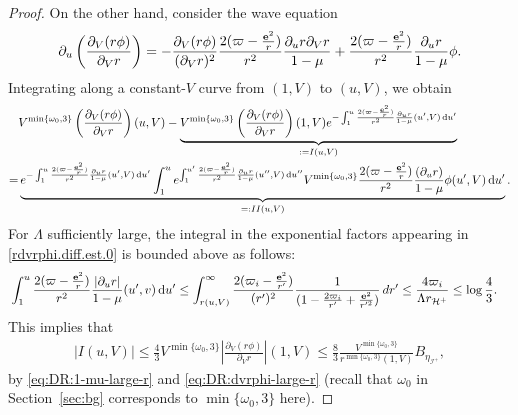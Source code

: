 \documentclass[10pt, reqno]{amsart}
\theoremstyle{definition}
\theoremstyle{remark}
\theoremstyle{conjecture}
\numberwithin{equation}{section}
\newcommand{\set}[1]{\{#1\}}
\newcommand{\ud}{\mathrm{d}}
\newcommand{\rd}{\partial}
\newcommand{\0}{\emptyset}
\newcommand{\omg}{\omega}
\newcommand{\bfe}{{\bf e}}
\newcommand{\calH}{\mathcal H}
\newcommand{\calI}{\mathcal I}
\newcommand{\f}{\frac}
\newcommand{\EH}{\calH^{+}}
\newcommand{\e}{\bfe}							%
\newcommand{\NI}{\calI^{+}}						%
\begin{document}
\begin{proof}
On the other hand, consider the wave equation
$$\rd_u\left(\f{\rd_V(r\phi)}{\rd_V r}\right) = -\f{\rd_V(r\phi)}{(\rd_V r)^2} \frac{2(\varpi - \frac{\e^{2}}{r})}{r^{2}} \frac{\rd_{u} r \rd_{V} r}{1-\mu} + \frac{2(\varpi - \frac{\e^{2}}{r})}{r^{2}} \frac{\rd_{u} r}{1-\mu}\phi.$$
Integrating along a constant-$V$ curve from $(1,V)$ to $(u,V)$, we obtain
\begin{equation}\label{rdvrphi.diff.est.0}
\begin{split}
&V^{\min\{\omg_0,3\}}\left(\f{\rd_V(r\phi)}{\rd_V r}\right)(u,V)
-\underbrace{V^{\min\{\omg_0, 3\}}\left(\f{\rd_V(r\phi)}{\rd_V r}\right)(1,V) e^{-\int_{1}^u \frac{2(\varpi - \frac{\e^{2}}{r})}{r^{2}} \frac{\rd_{u} r }{1-\mu}(u',V) \, \ud u'}}_{:=I(u,V)}\\
= & \underbrace{e^{-\int_{1}^u \frac{2(\varpi - \frac{\e^{2}}{r})}{r^{2}} \frac{\rd_{u} r }{1-\mu}(u',V) \, \ud u'}\int_{1}^u e^{\int_{1}^{u'} \frac{2(\varpi - \frac{\e^{2}}{r})}{r^{2}} \frac{\rd_{u} r }{1-\mu}(u'',V) \, \ud u''} V^{\min\{\omg_0,3\}}\frac{2(\varpi - \frac{\e^{2}}{r})}{r^{2}} \frac{(\rd_{u} r)}{1-\mu}\phi(u',V) \, \ud u'}_{=:II(u,V)}.
\end{split}
\end{equation}
For $\Lambda$ sufficiently large, the integral in the exponential factors appearing in \eqref{rdvrphi.diff.est.0} is bounded above as follows:
\begin{equation}\label{exp.factor}
\begin{split}
&\int_{1}^u \frac{2(\varpi - \frac{\e^{2}}{r})}{r^{2}} \frac{|\rd_{u} r| }{1-\mu}(u',v) \, \ud u'
\leq  \int_{r(u,V)}^{\infty} \frac{2(\varpi_{i} - \frac{\e^{2}}{r'})}{(r')^{2}} \frac{1 }{(1-\f{2\varpi_{i}}{r'}+\f{{\bf e}^2}{r'^2})} \, dr'\leq \f{4\varpi_i}{\Lambda r_{\EH}}\leq \log \f{4}{3}.
\end{split}
\end{equation}
This implies that
\begin{equation}\label{contra.upper.I.est}
\begin{split}
|I(u,V)|\leq \f 43 V^{\min\{\omg_0, 3\}}\left|\f{\rd_V(r\phi)}{\rd_V r}\right|(1,V)\leq \f 83 \f{V^{\min\{\omg_0, 3\}}}{r^{\min\set{\omg_0, 3}}(1,V)} B_{\eta_{\NI}},
\end{split}
\end{equation}
by \eqref{eq:DR:1-mu-large-r} and \eqref{eq:DR:dvrphi-large-r} (recall that $\omg_{0}$ in Section~\ref{sec:bg} corresponds to $\min\set{\omg_{0}, 3}$ here). 


\end{proof}
\end{document}
